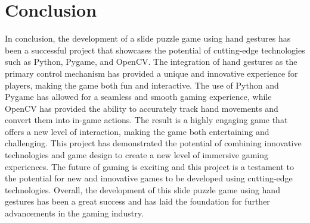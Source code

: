 \chapter{Conclusion} %
In conclusion, the development of a slide puzzle game using hand gestures has been a successful project that showcases the potential of cutting-edge technologies such as Python, Pygame, and OpenCV. The integration of hand gestures as the primary control mechanism has provided a unique and innovative experience for players, making the game both fun and interactive. The use of Python and Pygame has allowed for a seamless and smooth gaming experience, while OpenCV has provided the ability to accurately track hand movements and convert them into in-game actions. The result is a highly engaging game that offers a new level of interaction, making the game both entertaining and challenging. This project has demonstrated the potential of combining innovative technologies and game design to create a new level of immersive gaming experiences. The future of gaming is exciting and this project is a testament to the potential for new and innovative games to be developed using cutting-edge technologies. Overall, the development of this slide puzzle game using hand gestures has been a great success and has laid the foundation for further advancements in the gaming industry.